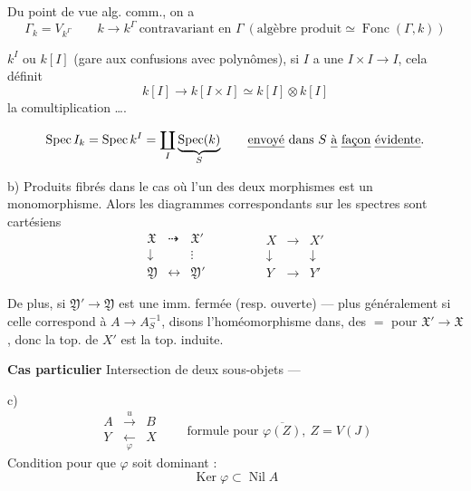\documentclass[11pt,a4paper]{article}
\begin{document}
Du point de vue alg. comm., on a
\[
\Gamma_k = V_{k^{\Gamma}} \qquad k \to k^{\Gamma} \ \text{contravariant en } \Gamma \ (\text{algèbre produit} \simeq \operatorname{Fonc}(\Gamma, k))
\]

$k^{I}$ ou $k[I]$ (gare aux confusions avec polynômes), si \struck{\ill{}} $I$ a une \struck{\ill{}}  $I \times I \to I$, cela définit
\[
k[I] \to k[I \times I] \simeq k[I] \otimes k[I]
\]
la comultiplication ….



\[
\operatorname{Spec} I_k = \operatorname{Spec} k^{I} = \coprod_{I} \underbrace{\operatorname{Spec}(k)}_{S} \qquad \text{\uncertain{envoyé} dans $S$ \uncertain{à} \uncertain{façon} \uncertain{évidente}.}
\]

b) Produits fibrés dans le cas où l'un des deux morphismes est un monomorphisme. Alors les diagrammes correspondants sur les spectres sont cartésiens
\[
\begin{array}{ccc}
\mathfrak{X} & \dashrightarrow & \mathfrak{X}' \\
\downarrow & & \vdots \\
\mathfrak{Y} & \longleftrightarrow & \mathfrak{Y}'
\end{array}
\qquad\qquad
\begin{array}{ccc}
X & \longrightarrow & X' \\
\downarrow & & \downarrow \\
Y & \longrightarrow & Y'
\end{array}
\]

De plus, si $\mathfrak{Y}' \to \mathfrak{Y}$ est une imm. fermée (resp. ouverte) --- plus généralement si celle correspond à $A \to A_S^{-1}$, disons l'homéomorphisme dans,  des $=$ pour $\mathfrak{X}' \to \mathfrak{X}$, donc la top. de $X'$ est la top. induite.

\textbf{Cas particulier} Intersection de deux sous-objets ---

c)
\[
\begin{array}{ccc}
A & \xrightarrow{\ u\ } & B \\
Y & \xleftarrow[\ \varphi\ ]{} & X
\end{array}
\qquad \text{formule pour } \overline{\varphi(Z)}, \ Z = V(J)
\]
Condition pour que $\varphi$ soit dominant :
\[
\operatorname{Ker} \varphi \subset \operatorname{Nil} A
\]
\end{document}
